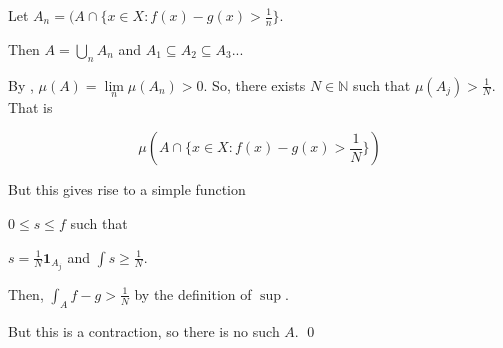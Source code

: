 \documentclass[11pt,oneside]{article}
\numberwithin{equation}{section}
\theoremstyle{definition}
\newtheorem{exercise}{Exercise}
\def\NN{\mathbb{N}}
\def\limn{\lim \limits _n}
\def\one{\mathbf{1}}
\begin{document}
\begin{solution}
  Let $A_n = (A \cap \{ x \in X : f(x) - g(x) > \frac{1}{n} \} $.

  Then $A = \bigcup \limits _n A_n$ and $A_1 \subseteq A_2 \subseteq A_3 ...$

  By , $\mu(A) =  \limn \mu(A_n) > 0$.  So, there exists $N \in \NN$ such that
  $\mu(A_j) > \frac{1}{N}$.  That is

  \[
  \mu(A \cap \{ x \in X : f(x) - g(x) > \frac{1}{N} \})
  \]

  But this gives rise to a simple function

  $ 0 \leq s \leq f$ such that

  $s = \frac{1}{N} \one _ {A_j}$ and $\int s \geq \frac{1}{N}$.

  Then, $\int _ {A} f - g > \frac{1}{N}$ by the definition of $\sup$.

  But this is a contraction, so there is no such $A$.  \qed
  
  
\end{solution}

\begin{comment}
\begin{exercise}
  problem
\end{exercise}
\begin{solution}
\begin{enumerate}[(a)]
\item
  first answer
\end{enumerate}
\end{solution}
\end{comment}
\end{document}
